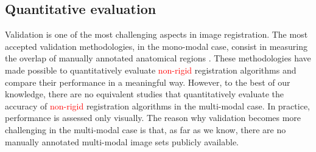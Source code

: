 
\vspace{-0.2cm}
\subsection{Quantitative evaluation}
Validation is one of the most challenging aspects in image registration. The most accepted validation methodologies, in the mono-modal case, consist in measuring the overlap of manually annotated anatomical regions \cite{Klein2009, Klein2010, Rohlfing2012}. These methodologies have made possible to quantitatively evaluate \textcolor{red}{non-rigid} registration algorithms and compare their performance in a meaningful way. However, to the best of our knowledge, there are no equivalent studies that quantitatively evaluate the accuracy of \textcolor{red}{non-rigid} registration algorithms in the multi-modal case. In practice, performance is assessed only visually. The reason why validation becomes more challenging in the multi-modal case is that, as far as we know, there are no manually annotated multi-modal image sets publicly available.

\vspace{-0.2cm}
